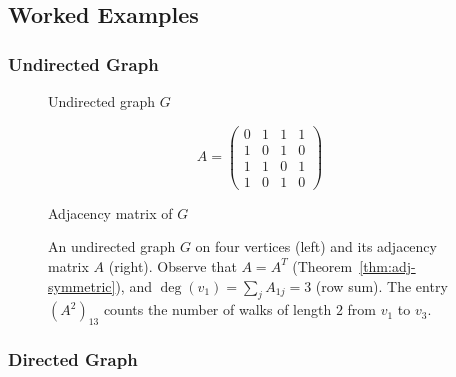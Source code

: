 \documentclass[12pt,a4paper]{article}
\theoremstyle{definition}
\theoremstyle{plain}
\theoremstyle{remark}
\begin{document}
\subsection{Worked Examples}

\subsubsection{Undirected Graph}

\begin{figure}[htbp]
  \centering
  \begin{minipage}{0.45\textwidth}
    \centering
    \par\vspace{4pt}
    {\small Undirected graph $G$}
  \end{minipage}
  \hfill
  \begin{minipage}{0.45\textwidth}
    \centering
    \[
      A =
      \begin{pmatrix}
        0 & 1 & 1 & 1 \\
        1 & 0 & 1 & 0 \\
        1 & 1 & 0 & 1 \\
        1 & 0 & 1 & 0
      \end{pmatrix}
    \]
    \par\vspace{4pt}
    {\small Adjacency matrix of $G$}
  \end{minipage}
  \caption{An undirected graph $G$ on four vertices (left) and its adjacency matrix $A$
           (right). Observe that $A = A^T$ (Theorem~\ref{thm:adj-symmetric}), and
           $\deg(v_1) = \sum_j A_{1j} = 3$ (row sum). The entry $(A^2)_{13}$ counts
           the number of walks of length $2$ from $v_1$ to $v_3$.}
  \label{fig:adj-matrix-undirected}
\end{figure}

\subsubsection{Directed Graph}
\end{document}
